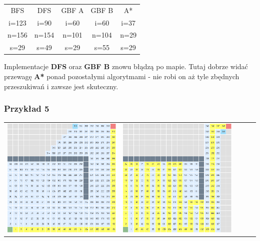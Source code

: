 \documentclass{article}
\begin{document}
\begin{center}
\begin{tabular}{c c c c c}
BFS & DFS & GBF A & GBF B & A* \\
i=123 & i=90 & i=60 & i=60 & i=37 \\
n=156 & n=154 & n=101 & n=104 & n=29\\
s=29 & s=49 & s=29 & s=55 & s=29\\
\end{tabular}
\end{center}
Implementacje \textbf{DFS} oraz \textbf{GBF B} znowu błądzą po mapie. Tutaj dobrze widać przewagę \textbf{A*} ponad pozostałymi algorytmami - nie robi on aż tyle zbędnych przeszukiwań i zawsze jest skuteczny.

\subsubsection{Przykład 5}
\begin{center}
\begin{tabular}{c c c c c}
\includegraphics[scale=0.15]{images/scr31.png} &
\includegraphics[scale=0.15]{images/scr32.png} &

\end{tabular}
\end{center}
\end{document}
